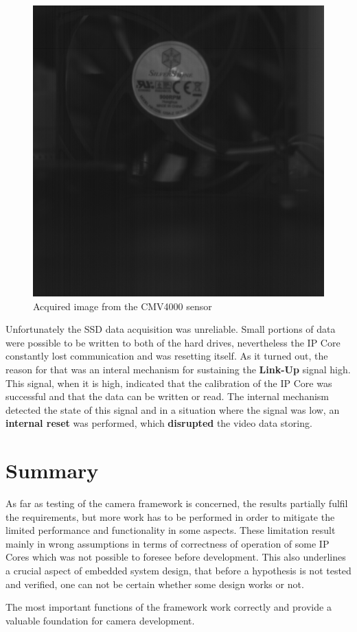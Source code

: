 \begin{figure}[H]
    \centering
    \includegraphics[width=13cm]{img/tests/output0.png}
    \caption{Acquired image from the CMV4000 sensor}
    \label{FIG:OUTPUT0}
\end{figure}


Unfortunately the SSD data acquisition was unreliable. Small portions of data were possible to be written to both of the
hard drives, nevertheless the IP Core constantly lost communication and was resetting itself. As it turned out, the
reason for that was an interal mechanism for sustaining the \textbf{Link-Up} signal high. This signal, when it is high,
indicated that the calibration of the IP Core was successful and that the data can be written or read. The internal
mechanism detected the state of this signal and in a situation where the signal was low, an \textbf{internal reset} was
performed, which \textbf{disrupted} the video data storing. 


\section{Summary}

As far as testing of the camera framework is concerned, the results partially fulfil the requirements, but more work
has to be performed in order to mitigate the limited performance and functionality in some aspects. These limitation
result mainly in wrong assumptions in terms of correctness of operation of some IP Cores which was not possible to
foresee before development. This also underlines a crucial aspect of embedded system design, that before a hypothesis is
not tested and verified, one can not be certain whether some design works or not. 

The most important functions of the framework work correctly and provide a valuable foundation for camera development.  



